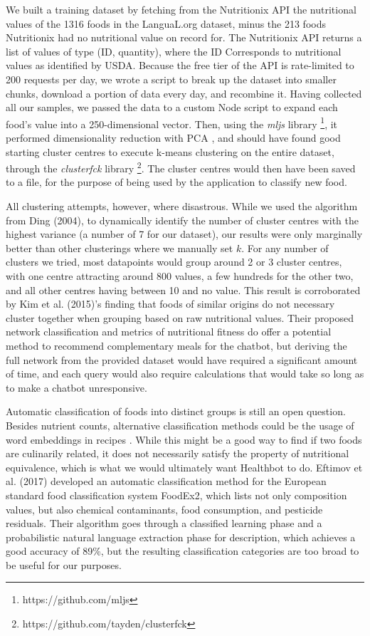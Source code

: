 We built a training dataset by fetching from the Nutritionix API the nutritional values of the 1316 foods in the LanguaL.org dataset, minus the 213 foods Nutritionix had no nutritional value on record for. The Nutritionix API returns a list of values of type (ID, quantity), where the ID Corresponds to nutritional values as identified by USDA. Because the free tier of the API is rate-limited to 200 requests per day, we wrote a script to break up the dataset into smaller chunks, download a portion of data every day, and recombine it. Having collected all our samples, we passed the data to a custom Node script to expand each food's value into a 250-dimensional vector. Then, using the \textit{mljs} library \footnote{https://github.com/mljs}, it performed dimensionality reduction with PCA \cite{Ding2004}, and should have found good starting cluster centres to execute k-means clustering on the entire dataset, through the \textit{clusterfck} library \footnote{https://github.com/tayden/clusterfck}. The cluster centres would then have been saved to a file, for the purpose of being used by the application to classify new food. 

All clustering attempts, however, where disastrous. While we used the algorithm from Ding (2004)\cite{Ding2004}, to dynamically identify the number of cluster centres with the highest variance (a number of 7 for our dataset), our results were only marginally better than other clusterings where we manually set $k$. For any number of clusters we tried, most datapoints would group around 2 or 3 cluster centres, with one centre attracting around 800 values, a few hundreds for the other two, and all other centres having between 10 and no value. This result is corroborated by Kim et al. (2015)\cite{Kim2015a}'s finding that foods of similar origins do not necessary cluster together when grouping based on raw nutritional values. Their proposed network classification and metrics of nutritional fitness do offer a potential method to recommend complementary meals for the chatbot, but deriving the full network from the provided dataset would have required a significant amount of time, and each query would also require calculations that would take so long as to make a chatbot unresponsive.

Automatic classification of foods into distinct groups is still an open question. Besides nutrient counts, alternative classification methods could be the usage of word embeddings in recipes \cite{food2vec}. While this might be a good way to find if two foods are culinarily related, it does not necessarily satisfy the property of nutritional equivalence, which is what we would ultimately want Healthbot to do.
Eftimov et al. (2017)\cite{Eftimov2017} developed an automatic classification method for the European standard food classification system FoodEx2, which lists not only composition values, but also chemical contaminants, food consumption, and pesticide residuals. Their algorithm goes through a classified learning phase and a probabilistic natural language extraction phase for description, which achieves a good accuracy of 89\%, but the resulting classification categories are too broad to be useful for our purposes.


